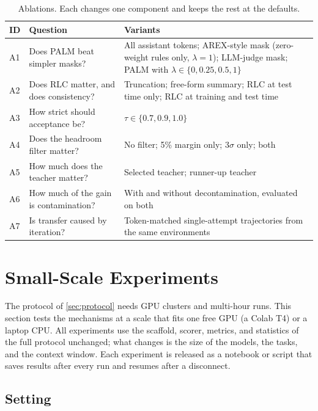 \documentclass[11pt]{article}
\begin{document}
\begin{table}[t]
\centering
\small
\caption{Ablations. Each changes one component and keeps the rest at the defaults.}
\label{tab:ablations}
\begin{tabularx}{\linewidth}{@{}l l Y@{}}
\toprule
ID & Question & Variants \\
\midrule
A1 & Does PALM beat simpler masks? & All assistant tokens; AREX-style mask (zero-weight rules only, $\lambda=1$); LLM-judge mask; PALM with $\lambda \in \{0, 0.25, 0.5, 1\}$ \\
A2 & Does RLC matter, and does consistency? & Truncation; free-form summary; RLC at test time only; RLC at training and test time \\
A3 & How strict should acceptance be? & $\tau \in \{0.7, 0.9, 1.0\}$ \\
A4 & Does the headroom filter matter? & No filter; 5\% margin only; $3\sigma$ only; both \\
A5 & How much does the teacher matter? & Selected teacher; runner-up teacher \\
A6 & How much of the gain is contamination? & With and without decontamination, evaluated on both \\
A7 & Is transfer caused by iteration? & Token-matched single-attempt trajectories from the same environments \\
\bottomrule
\end{tabularx}
\end{table}

\section{Small-Scale Experiments}
\label{sec:small}

The protocol of \cref{sec:protocol} needs GPU clusters and multi-hour runs. This section tests the mechanisms at a scale that fits one free GPU (a Colab T4) or a laptop CPU. All experiments use the scaffold, scorer, metrics, and statistics of the full protocol unchanged; what changes is the size of the models, the tasks, and the context window. Each experiment is released as a notebook or script that saves results after every run and resumes after a disconnect.

\subsection{Setting}
\label{sec:smallsetting}
\end{document}
